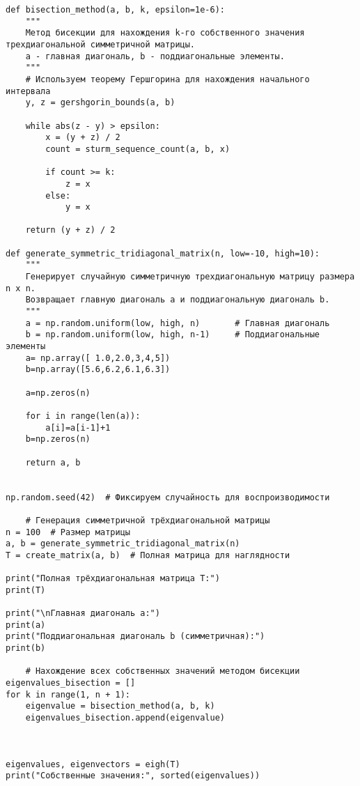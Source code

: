 \documentclass{article}
\begin{document}
\begin{verbatim}
def bisection_method(a, b, k, epsilon=1e-6):
    """
    Метод бисекции для нахождения k-го собственного значения трехдиагональной симметричной матрицы.
    a - главная диагональ, b - поддиагональные элементы.
    """
    # Используем теорему Гершгорина для нахождения начального интервала
    y, z = gershgorin_bounds(a, b)
    
    while abs(z - y) > epsilon:
        x = (y + z) / 2
        count = sturm_sequence_count(a, b, x)
        
        if count >= k:
            z = x
        else:
            y = x
    
    return (y + z) / 2

def generate_symmetric_tridiagonal_matrix(n, low=-10, high=10):
    """
    Генерирует случайную симметричную трехдиагональную матрицу размера n x n.
    Возвращает главную диагональ a и поддиагональную диагональ b.
    """
    a = np.random.uniform(low, high, n)       # Главная диагональ
    b = np.random.uniform(low, high, n-1)     # Поддиагональные элементы
    a= np.array([ 1.0,2.0,3,4,5])
    b=np.array([5.6,6.2,6.1,6.3])
    
    a=np.zeros(n)
    
    for i in range(len(a)):
        a[i]=a[i-1]+1
    b=np.zeros(n)

    return a, b


np.random.seed(42)  # Фиксируем случайность для воспроизводимости
    
    # Генерация симметричной трёхдиагональной матрицы
n = 100  # Размер матрицы
a, b = generate_symmetric_tridiagonal_matrix(n)
T = create_matrix(a, b)  # Полная матрица для наглядности
    
print("Полная трёхдиагональная матрица T:")
print(T)
    
print("\nГлавная диагональ a:")
print(a)
print("Поддиагональная диагональ b (симметричная):")
print(b)
    
    # Нахождение всех собственных значений методом бисекции
eigenvalues_bisection = []
for k in range(1, n + 1):
    eigenvalue = bisection_method(a, b, k)
    eigenvalues_bisection.append(eigenvalue)
    


eigenvalues, eigenvectors = eigh(T)
print("Собственные значения:", sorted(eigenvalues))


\end{verbatim}
\end{document}
